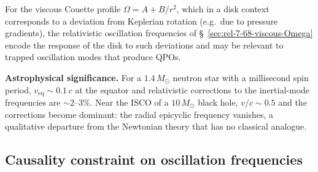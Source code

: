 For the viscous Couette profile $\Omega = A + B/r^2$, which in a
disk context corresponds to a deviation from Keplerian rotation
(e.g.\ due to pressure gradients), the relativistic oscillation
frequencies of \S~\ref{sec:rel-7-68-viscous-Omega} encode the
response of the disk to such deviations and may be relevant to
trapped oscillation modes that produce QPOs.

\begin{relcorrection}
\textbf{Astrophysical significance.}
For a $1.4\,M_\odot$ neutron star with a millisecond spin period,
$v_{\mathrm{eq}} \sim 0.1\,c$ at the equator and relativistic
corrections to the inertial-mode frequencies are $\sim 2$--$3\%$.
Near the ISCO of a $10\,M_\odot$ black hole, $v/c \sim 0.5$
and the corrections become dominant: the radial epicyclic frequency
vanishes, a qualitative departure from the Newtonian theory that
has no classical analogue.
\end{relcorrection}

\subsection{Causality constraint on oscillation frequencies}
\label{sec:rel-7-68-causality}

